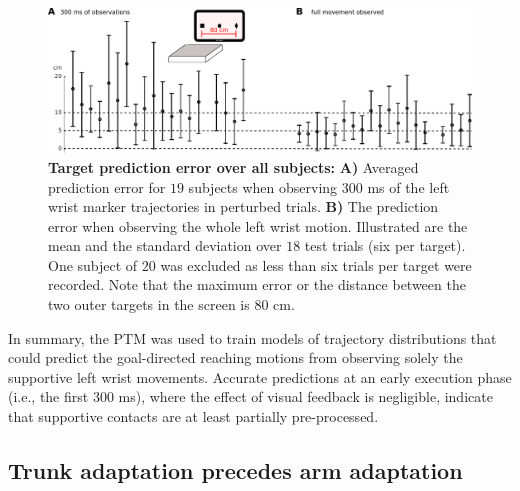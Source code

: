 \begin{figure}[t]
\centering
\includegraphics[width=\textwidth]{Elmar/picsClean/SubFigPredError9DoF}
 \caption{\textbf{Target prediction error over all subjects:} 
 \textbf{A)} Averaged prediction error for $19$ subjects when observing $300$ ms of the left wrist marker trajectories in perturbed trials. 
 \textbf{B)} The prediction error when observing the whole left wrist motion. Illustrated are the mean and the 
 standard deviation over $18$ test trials (six per target). One subject of $20$ was excluded as less than six trials per target were recorded. 
 Note that the maximum error or the distance between the two outer targets in the screen is $80$ cm.
 }
\label{fig:subFigPerdErrorAllSubjects}
\end{figure}

In summary, the PTM was used to train models of trajectory distributions that 
could predict the goal-directed reaching motions from observing solely the 
supportive left wrist movements. Accurate predictions at an early execution 
phase (i.e., the first $300$ ms), where the effect of visual feedback is 
negligible, indicate that supportive contacts are at least partially 
pre-processed. 


\subsection*{Trunk adaptation precedes arm adaptation}

